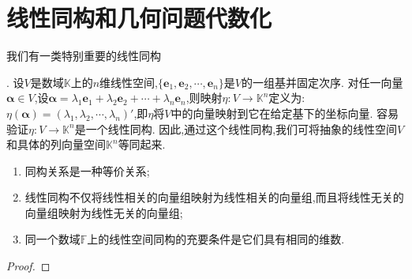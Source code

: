 \documentclass[lang=cn,newtx,10pt,scheme=chinese]{elegantbook}
\begin{document}
\section{线性同构和几何问题代数化}

\hypertarget{线性同构1}{我们有一类特别重要的线性同构}. 设\(V\)是数域\(\mathbb{K}\)上的\(n\)维线性空间,\(\{\boldsymbol{e}_1,\boldsymbol{e}_2,\cdots,\boldsymbol{e}_n\}\)是\(V\)的一组基并固定次序. 对任一向量\(\boldsymbol{\alpha}\in V\),设\(\boldsymbol{\alpha}=\lambda_1\boldsymbol{e}_1+\lambda_2\boldsymbol{e}_2+\cdots+\lambda_n\boldsymbol{e}_n\),则映射\(\eta:V\to\mathbb{K}^n\)定义为:\(\eta(\boldsymbol{\alpha})=(\lambda_1,\lambda_2,\cdots,\lambda_n)'\),即\(\eta\)将\(V\)中的向量映射到它在给定基下的坐标向量. 容易验证\(\eta:V\to\mathbb{K}^n\)是一个线性同构. 因此,通过这个线性同构,我们可将抽象的线性空间\(V\)和具体的列向量空间\(\mathbb{K}^n\)等同起来.

\begin{theorem}\label{theorem:线性空间的同构}
\begin{enumerate}[(1)]
    \item 同构关系是一种等价关系;
    \item 线性同构不仅将线性相关的向量组映射为线性相关的向量组,而且将线性无关的向量组映射为线性无关的向量组;
    \item 同一个数域\(\mathbb{F}\)上的线性空间同构的充要条件是它们具有相同的维数.
\end{enumerate}
\end{theorem}
\begin{proof}
    
\end{proof}
\end{document}
